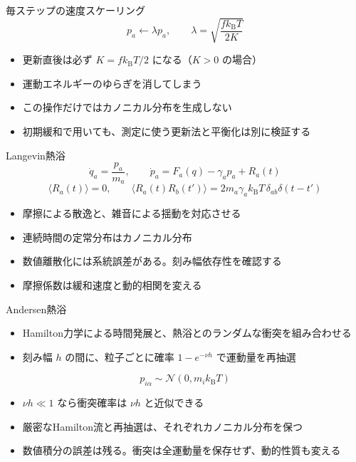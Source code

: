 \documentclass[10pt,aspectratio=169]{beamer}
\begin{document}
\begin{frame}{毎ステップの速度スケーリング}
\[
p_a\leftarrow\lambda p_a,\qquad
\lambda=\sqrt{\frac{f k_{\mathrm B}T}{2K}}
\]
\begin{itemize}
\item 更新直後は必ず $K=f k_{\mathrm B}T/2$ になる（$K>0$ の場合）
\item 運動エネルギーのゆらぎを消してしまう
\item この操作だけではカノニカル分布を生成しない
\item 初期緩和で用いても、測定に使う更新法と平衡化は別に検証する
\end{itemize}
\end{frame}

\begin{frame}{Langevin熱浴}
\[
\dot q_a=\frac{p_a}{m_a},\qquad
\dot p_a=F_a(q)-\gamma_a p_a+R_a(t)
\]
\[
\langle R_a(t)\rangle=0,\qquad
\langle R_a(t)R_b(t')\rangle
=2m_a\gamma_a k_{\mathrm B}T\,\delta_{ab}\delta(t-t')
\]
\begin{itemize}
\item 摩擦による散逸と、雑音による揺動を対応させる
\item 連続時間の定常分布はカノニカル分布
\item 数値離散化には系統誤差がある。刻み幅依存性を確認する
\item 摩擦係数は緩和速度と動的相関を変える
\end{itemize}
\end{frame}

\begin{frame}{Andersen熱浴}
\begin{itemize}
\item Hamilton力学による時間発展と、熱浴とのランダムな衝突を組み合わせる
\item 刻み幅 $h$ の間に、粒子ごとに確率 $1-e^{-\nu h}$ で運動量を再抽選
\end{itemize}
\[
p_{i\alpha}\sim\mathcal N(0,m_i k_{\mathrm B}T)
\]
\begin{itemize}
\item $\nu h\ll1$ なら衝突確率は $\nu h$ と近似できる
\item 厳密なHamilton流と再抽選は、それぞれカノニカル分布を保つ
\item 数値積分の誤差は残る。衝突は全運動量を保存せず、動的性質も変える
\end{itemize}
\end{frame}
\end{document}
